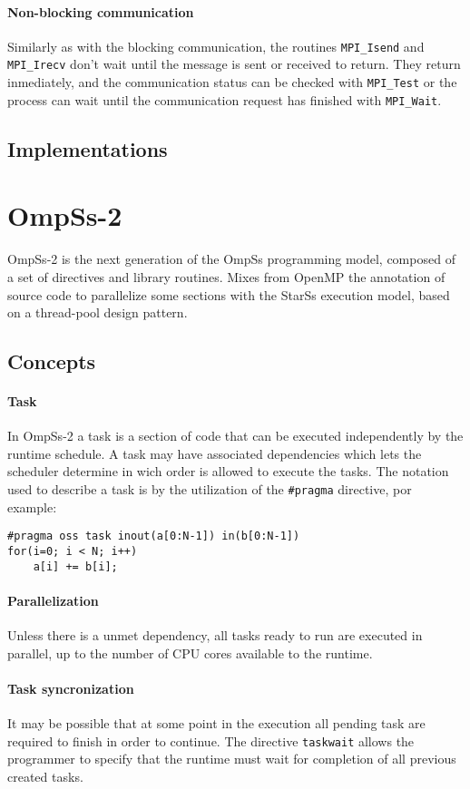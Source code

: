 \paragraph{Non-blocking communication} Similarly as with the blocking
communication, the routines \texttt{MPI\_Isend} and \texttt{MPI\_Irecv} don't
wait until the message is sent or received to return. They return inmediately,
and the communication status can be checked with \texttt{MPI\_Test} or the
process can wait until the communication request has finished with
\texttt{MPI\_Wait}.

\subsection{Implementations}


\section{OmpSs-2}

OmpSs-2 is the next generation of the OmpSs programming model, composed of a set
of directives and library routines. Mixes from OpenMP the annotation of source
code to parallelize some sections with the StarSs execution model, based on a
thread-pool design pattern.

\subsection{Concepts}

\paragraph{Task} In OmpSs-2 a task is a section of code that can be executed
independently by the runtime schedule. A task may have associated dependencies
which lets the scheduler determine in wich order is allowed to execute the
tasks. The notation used to describe a task is by the utilization of the
\texttt{\#pragma} directive, por example:
%
\begin{lstlisting}
#pragma oss task inout(a[0:N-1]) in(b[0:N-1])
for(i=0; i < N; i++)
	a[i] += b[i];
\end{lstlisting}
%

\paragraph{Parallelization} Unless there is a unmet dependency, all tasks ready
to run are executed in parallel, up to the number of CPU cores available to the
runtime.

\paragraph{Task syncronization} It may be possible that at some point in the
execution all pending task are required to finish in order to continue. The
directive \texttt{taskwait} allows the programmer to specify that the runtime
must wait for completion of all previous created tasks.
